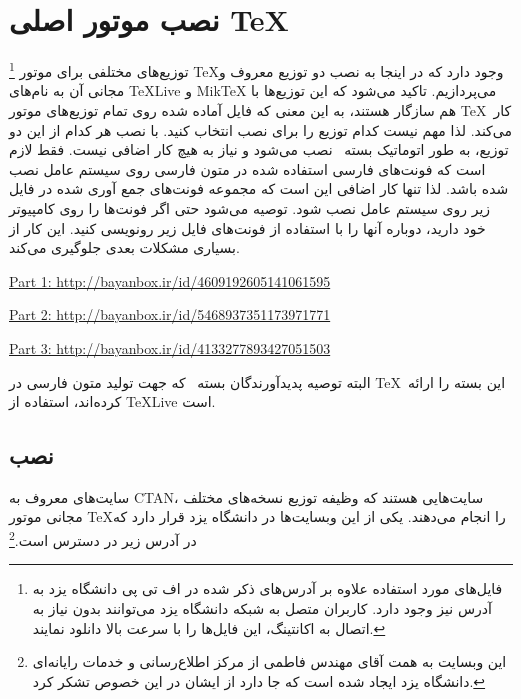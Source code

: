 \section{نصب موتور اصلی \TeX}\footnote{فایل‌های مورد استفاده علاوه بر آدرس‌های ذکر شده در اف تی پی دانشگاه یزد به آدرس  
\href{ftp://ftp.yazd.ac.ir:8621/Mathematic/TeX}{}
نیز وجود دارد. کاربران متصل به شبکه دانشگاه یزد می‌توانند بدون  نیاز به اتصال به اکانتینگ، این فایل‌ها را با سرعت بالا دانلود نمایند.}
توزیع‌های مختلفی برای موتور \TeX وجود دارد که در اینجا به نصب دو توزیع
معروف و مجانی آن به نام‌های TeXLive  و MikTeX می‌پردازیم. تاکید می‌شود که این توزیع‌ها با هم سازگار هستند، به این
معنی که فایل آماده شده روی تمام توزیع‌های موتور \TeX \ کار می‌کند. لذا مهم نیست کدام
توزیع را برای نصب انتخاب کنید. با نصب هر کدام از این دو توزیع، به طور اتوماتیک
بسته \XePersian \  نصب می‌شود و نیاز به هیچ کار اضافی نیست. فقط لازم است
که فونت‌های فارسی استفاده شده در متون فارسی روی سیستم عامل نصب شده باشد. لذا
تنها کار اضافی این است که مجموعه فونت‌های جمع آوری شده در فایل زیر روی سیستم عامل
نصب شود. توصیه می‌شود حتی اگر فونت‌ها را روی کامپیوتر خود دارید، دوباره آنها را با استفاده
از فونت‌های فایل زیر رونویسی کنید. این کار از بسیاری مشکلات بعدی جلوگیری می‌کند.
\begin{latin}

\href{http://bayanbox.ir/id/4609192605141061595}{Part 1: http://bayanbox.ir/id/4609192605141061595}

\href{http://bayanbox.ir/id/5468937351173971771}{Part 2: http://bayanbox.ir/id/5468937351173971771}

\href{http://bayanbox.ir/id/4133277893427051503}{Part 3: http://bayanbox.ir/id/4133277893427051503}
\end{latin}

البته توصیه پدیدآورندگان بسته \XePersian \ که جهت تولید متون فارسی در \TeX \ 
این بسته را ارائه کرده‌اند، استفاده از  TeXLive  است. 
\subsection{نصب }
سایت‌های معروف به CTAN، سایت‌هایی هستند که  وظیفه توزیع نسخه‌های مختلف
مجانی موتور \TeX را انجام می‌دهند. یکی از این وبسایت‌ها در  دانشگاه یزد 
قرار دارد که در آدرس زیر در دسترس است.\footnote{این وبسایت به همت آقای
مهندس فاطمی از مرکز اطلاع‌رسانی و خدمات رایانه‌ای دانشگاه یزد ایجاد شده است که
جا دارد از ایشان در این خصوص تشکر کرد.}

